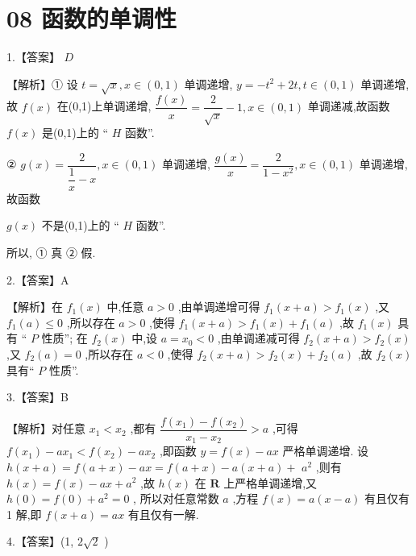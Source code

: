 \documentclass[10pt]{article}
\begin{document}
\section*{08 函数的单调性}

1.【答案】 ${D}$

【解析】① 设 $t = \sqrt{x},x \in  \left( {0,1}\right)$ 单调递增, $y =  - {t}^{2} + {2t},t \in  \left( {0,1}\right)$ 单调递增,故 $f\left( x\right)$ 在(0,1)上单调递增, $\dfrac{f\left( x\right) }{x} = \dfrac{2}{\sqrt{x}} - 1,x \in  \left( {0,1}\right)$ 单调递减,故函数 $f\left( x\right)$ 是(0,1)上的 “ $H$ 函数”.

② $g\left( x\right)  = \dfrac{2}{\dfrac{1}{x} - x},x \in  \left( {0,1}\right)$ 单调递增, $\dfrac{g\left( x\right) }{x} = \dfrac{2}{1 - {x}^{2}},x \in  \left( {0,1}\right)$ 单调递增,故函数

$g\left( x\right)$ 不是(0,1)上的 “ $H$ 函数”.

所以, ① 真 ② 假.

2.【答案】A

【解析】在 ${f}_{1}\left( x\right)$ 中,任意 $a > 0$ ,由单调递增可得 ${f}_{1}\left( {x + a}\right)  > {f}_{1}\left( x\right)$ ,又 ${f}_{1}\left( a\right)  \leq  0$ ,所以存在 $a > 0$ ,使得 ${f}_{1}\left( {x + a}\right)  > {f}_{1}\left( x\right)  + {f}_{1}\left( a\right)$ ,故 ${f}_{1}\left( x\right)$ 具有 “ $P$ 性质”; 在 ${f}_{2}\left( x\right)$ 中,设 $a = {x}_{0} < 0$ ,由单调递减可得 ${f}_{2}\left( {x + a}\right)  > {f}_{2}\left( x\right)$ ,又 ${f}_{2}\left( a\right)  = 0$ ,所以存在 $a < 0$ ,使得 ${f}_{2}\left( {x + a}\right)  > {f}_{2}\left( x\right)  + {f}_{2}\left( a\right)$ ,故 ${f}_{2}\left( x\right)$ 具有“ $P$ 性质”.

3.【答案】B

【解析】对任意 ${x}_{1} < {x}_{2}$ ,都有 $\dfrac{f\left( {x}_{1}\right)  - f\left( {x}_{2}\right) }{{x}_{1} - {x}_{2}} > a$ ,可得 $f\left( {x}_{1}\right)  - a{x}_{1} < f\left( {x}_{2}\right)  - a{x}_{2}$ ,即函数 $y = f\left( x\right)  - {ax}$ 严格单调递增. 设 $h\left( {x + a}\right)  = f\left( {a + x}\right)  - {ax} = f\left( {a + x}\right)  - a\left( {x + a}\right)  +$  ${a}^{2}$ ,则有 $h\left( x\right)  = f\left( x\right)  - {ax} + {a}^{2}$ ,故 $h\left( x\right)$ 在 $\mathbf{R}$ 上严格单调递增,又 $h\left( 0\right)  = f\left( 0\right)  + {a}^{2} = 0$ , 所以对任意常数 $a$ ,方程 $f\left( x\right)  = a\left( {x - a}\right)$ 有且仅有 1 解,即 $f\left( {x + a}\right)  = {ax}$ 有且仅有一解.

4.【答案】(1, $2\sqrt{2}$ )
\end{document}
